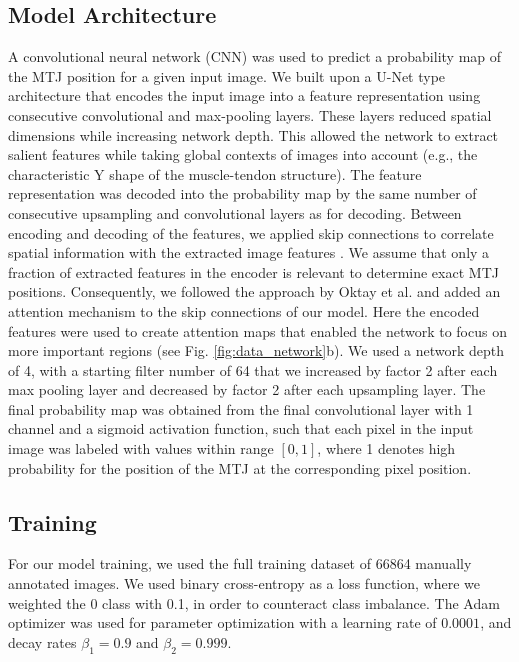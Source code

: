 \documentclass[journal,twoside,web]{ieeecolor}
\begin{document}
\subsection*{Model Architecture}
A convolutional neural network (CNN) was used to predict a probability map of the MTJ position for a given input image. We built upon a U-Net type architecture \cite{j:Ronneberger2015} that encodes the input image into a feature representation using consecutive convolutional and max-pooling layers. These layers reduced spatial dimensions while increasing network depth. This allowed the network to extract salient features while taking global contexts of images into account (e.g., the characteristic Y shape of the muscle-tendon structure). The feature representation was decoded into the probability map by the same number of consecutive upsampling and convolutional layers as for decoding. Between encoding and decoding of the features, we applied skip connections to correlate spatial information with the extracted image features \cite{j:Ronneberger2015}. We assume that only a fraction of extracted features in the encoder is relevant to determine exact MTJ positions. Consequently, we followed the approach by Oktay et al. \cite{j:Oktay2018} and added an attention mechanism to the skip connections of our model. Here the encoded features were used to create attention maps that enabled the network to focus on more important regions (see Fig. \ref{fig:data_network}b). We used a network depth of 4, with a starting filter number of 64 that we increased by factor 2 after each max pooling layer and decreased by factor 2 after each upsampling layer. The final probability map was obtained from the final convolutional layer with 1 channel and a sigmoid activation function, such that each pixel in the input image was labeled with values within range $[0, 1]$, where 1 denotes high probability for the position of the MTJ at the corresponding pixel position.

\subsection*{Training}
\label{sec:methods.train}
For our model training, we used the full training dataset of 66864 manually annotated images. We used binary cross-entropy as a loss function, where we weighted the 0 class with 0.1, in order to counteract class imbalance. The Adam optimizer was used for parameter optimization with a learning rate of $0.0001$, and decay rates $\beta_1 = 0.9$ and $\beta_2 = 0.999$.
\end{document}
